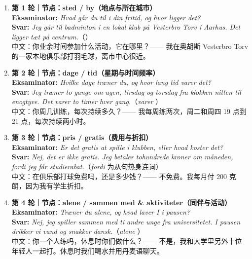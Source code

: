 \begin{enumerate}
  \item \textbf{\color{NCDRed}第 1 轮｜节点：sted / by（地点与所在城市）}\\
    \textbf{Eksaminator:} \textit{Hvad går du til i din fritid, og hvor ligger det?}\\
    \textbf{Svar:} \textit{Jeg går til badminton i en lokal klub på Vesterbro Torv i Aarhus. Det ligger tæt på centrum.}（）\\
    {\small\textcolor{NCDGray}{中文：你业余时间参加什么活动，它在哪里？—— 我在奥胡斯 Vesterbro Torv 的一家本地俱乐部打羽毛球，离市中心很近。}}

  \item \textbf{\color{NCDRed}第 2 轮｜节点：dage / tid（星期与时间频率）}\\
    \textbf{Eksaminator:} \textit{Hvilke dage træner du, og hvor lang tid varer det?}\\
    \textbf{Svar:} \textit{Jeg træner to gange om ugen, tirsdag og torsdag fra klokken nitten til enogtyve. Det varer to timer hver gang.}（\textit{varer} ）\\
    {\small\textcolor{NCDGray}{中文：你周几训练，每次持续多久？—— 我每周练两次，周二和周四 19 点到 21 点，每次持续两小时。}}

  \item \textbf{\color{NCDRed}第 3 轮｜节点：pris / gratis（费用与折扣）}\\
    \textbf{Eksaminator:} \textit{Er det gratis at spille i klubben, eller hvad koster det?}\\
    \textbf{Svar:} \textit{Nej, det er ikke gratis. Jeg betaler tohundrede kroner om måneden, fordi jeg får studierabat.}（\textit{fordi} 为从句热身连词）\\
    {\small\textcolor{NCDGray}{中文：在俱乐部打球免费吗，还是多少钱？—— 不免费。我每月付 200 克朗，因为我有学生折扣。}}

  \item \textbf{\color{NCDRed}第 4 轮｜节点：alene / sammen med \& aktiviteter（同伴与活动）}\\
    \textbf{Eksaminator:} \textit{Træner du alene, og hvad laver I i pausen?}\\
    \textbf{Svar:} \textit{Nej, jeg spiller sammen med ti andre unge fra universitetet. I pausen drikker vi vand og snakker dansk.}（\textit{alene} ）\\
    {\small\textcolor{NCDGray}{中文：你一个人练吗，休息时你们做什么？—— 不是，我和大学里另外十位年轻人一起打。休息时我们喝水并用丹麦语聊天。}}


\end{enumerate}
